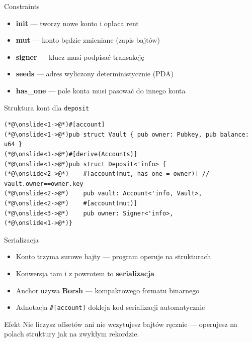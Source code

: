 \begin{frame}[fragile]{Constraints}
  \begin{itemize}
    \item \textbf{init} --- tworzy nowe konto i opłaca rent
    \item \textbf{mut} --- konto będzie zmieniane (zapis bajtów)
    \item \textbf{signer} --- klucz musi podpisać transakcję
    \item \textbf{seeds} --- adres wyliczony deterministycznie (PDA)
    \item \textbf{has\_one} --- pole konta musi pasować do innego konta
  \end{itemize}
  \begin{codeblock}{Struktura kont dla \texttt{deposit}}
\begin{lstlisting}[style=reveal]
(*@\onslide<1->@*)#[account]
(*@\onslide<1->@*)pub struct Vault { pub owner: Pubkey, pub balance: u64 }
(*@\onslide<1->@*)#[derive(Accounts)]
(*@\onslide<1->@*)pub struct Deposit<'info> {
(*@\onslide<2->@*)    #[account(mut, has_one = owner)] // vault.owner==owner.key
(*@\onslide<2->@*)    pub vault: Account<'info, Vault>,
(*@\onslide<2->@*)    #[account(mut)]
(*@\onslide<3->@*)    pub owner: Signer<'info>,
(*@\onslide<1->@*)}
\end{lstlisting}
  \end{codeblock}
\end{frame}

\begin{frame}{Serializacja}
  \begin{itemize}
    \item Konto trzyma surowe bajty --- program operuje na strukturach
    \item Konwersja tam i z powrotem to \textbf{serializacja}
    \item Anchor używa \textbf{Borsh} --- kompaktowego formatu binarnego
    \item Adnotacja \texttt{\#[account]} dokleja kod serializacji automatycznie
  \end{itemize}
  \vspace{0.25cm}
  \begin{exampleblock}{Efekt}
    Nie liczysz offsetów ani nie wczytujesz bajtów ręcznie ---
    operujesz na polach struktury jak na zwykłym rekordzie.
  \end{exampleblock}
\end{frame}

